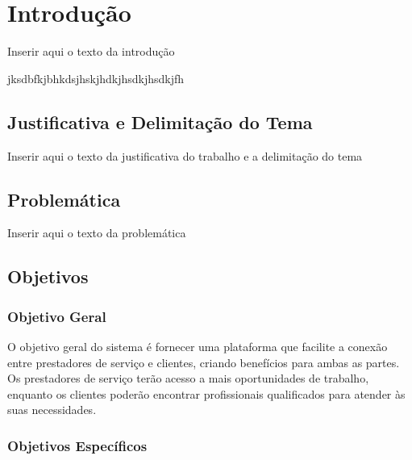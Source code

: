 \chapter{Introdução}

Inserir aqui o texto da introdução

jksdbfkjbhkdsjhskjhdkjhsdkjhsdkjfh

\section{Justificativa e Delimitação do Tema}

Inserir aqui o texto da justificativa do trabalho e a delimitação do tema

\section{Problemática}

Inserir aqui o texto da problemática

\section{Objetivos}



\subsection{Objetivo Geral}
O objetivo geral do sistema é fornecer uma plataforma que facilite a conexão entre prestadores de serviço e clientes, 
criando benefícios para ambas as partes. Os prestadores de serviço terão acesso a mais oportunidades de trabalho, 
enquanto os clientes poderão encontrar profissionais qualificados para atender às suas necessidades.

\subsection{Objetivos Específicos}

